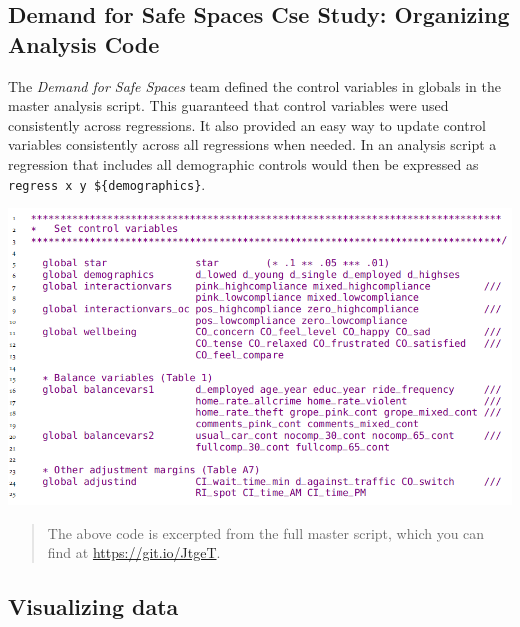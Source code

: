 \documentclass[
]{book}
\begin{document}
\begin{ex}
\hypertarget{demand-for-safe-spaces-cse-study-organizing-analysis-code}{%
\subsection{Demand for Safe Spaces Cse Study: Organizing Analysis Code}\label{demand-for-safe-spaces-cse-study-organizing-analysis-code}}

The \emph{Demand for Safe Spaces} team defined the control variables in globals in the master analysis script. This guaranteed that control variables were used consistently across regressions. It also provided an easy way to update control variables consistently across all regressions when needed. In an analysis script a regression that includes all demographic controls would then be expressed as \texttt{regress\ x\ y\ \$\{demographics\}}.

\includegraphics{examples/ch6-organizing-analysis-code.png}

\begin{quote}
The above code is excerpted from the full master script, which you can find at \url{https://git.io/JtgeT}.
\end{quote}
\end{ex}

\hypertarget{visualizing-data}{%
\subsection*{Visualizing data}\label{visualizing-data}}
\end{document}
